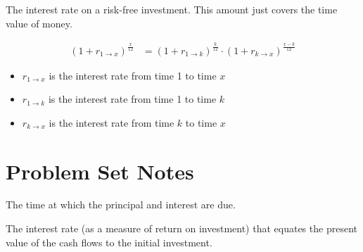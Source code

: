 \begin{definition}
    The interest rate on a risk-free investment. This amount just covers the time value of money.
\end{definition}

\begin{theorem}
    \begin{align*}
        (1 + r_{1 \to x})^{\frac{x}{12}} &= (1 + r_{1 \to k})^{\frac{k}{12}} \cdot (1 + r_{k \to x})^{\frac{x-k}{12}}
    \end{align*}
    \begin{itemize}
        \item $r_{1 \to x}$ is the interest rate from time 1 to time $x$
        \item $r_{1 \to k}$ is the interest rate from time 1 to time $k$
        \item $r_{k \to x}$ is the interest rate from time $k$ to time $x$
    \end{itemize}
\end{theorem}



\section{Problem Set Notes}
\begin{vocabulary}
    [Maturity]
    The time at which the principal and interest are due.
\end{vocabulary}
\begin{vocabulary}
    The interest rate (as a measure of return on investment) that equates the present value of the cash flows to the initial investment.
\end{vocabulary}